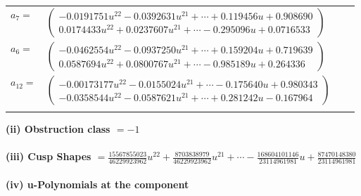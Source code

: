 \documentclass[1p]{elsarticle_modified}
\theoremstyle{definition}
\begin{document}
\begin{tabular}{m{7pt} m{180pt} m{7pt} m{180pt} }
\flushright $a_{7}=$&$\begin{pmatrix}-0.0191751 u^{22}-0.0392631 u^{21}+\cdots+0.119456 u+0.908690\\0.0174433 u^{22}+0.0237607 u^{21}+\cdots-0.295096 u+0.0716533\end{pmatrix}$ \\
\flushright $a_{6}=$&$\begin{pmatrix}-0.0462554 u^{22}-0.0937250 u^{21}+\cdots+0.159204 u+0.719639\\0.0587694 u^{22}+0.0800767 u^{21}+\cdots-0.985189 u+0.264336\end{pmatrix}$ \\
\flushright $a_{12}=$&$\begin{pmatrix}-0.00173177 u^{22}-0.0155024 u^{21}+\cdots-0.175640 u+0.980343\\-0.0358544 u^{22}-0.0587621 u^{21}+\cdots+0.281242 u-0.167964\end{pmatrix}$\\&\end{tabular}
\flushleft \textbf{(ii) Obstruction class $= -1$}\\~\\
\flushleft \textbf{(iii) Cusp Shapes $= \frac{15567855023}{46229923962} u^{22}+\frac{8703838979}{46229923962} u^{21}+\cdots-\frac{168604101146}{23114961981} u+\frac{87470148380}{23114961981}$}\\~\\
\newpage\renewcommand{\arraystretch}{1}
\flushleft \textbf{(iv) u-Polynomials at the component}\newline \\
\end{document}
